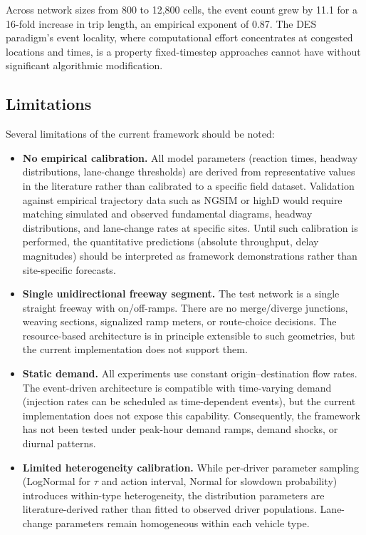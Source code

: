 \documentclass[review,number]{elsarticle}
\begin{document}
Across network sizes from 800 to 12{,}800 cells, the event count grew by 11.1 for a 16-fold increase in trip length, an empirical exponent of 0.87. The DES paradigm's event locality, where computational effort concentrates at congested locations and times, is a property fixed-timestep approaches cannot have without significant algorithmic modification.

\subsection{Limitations}

Several limitations of the current framework should be noted:

\begin{itemize}
    \item \textbf{No empirical calibration.} All model parameters (reaction times, headway distributions, lane-change thresholds) are derived from representative values in the literature rather than calibrated to a specific field dataset. Validation against empirical trajectory data such as NGSIM or highD would require matching simulated and observed fundamental diagrams, headway distributions, and lane-change rates at specific sites. Until such calibration is performed, the quantitative predictions (absolute throughput, delay magnitudes) should be interpreted as framework demonstrations rather than site-specific forecasts.

    \item \textbf{Single unidirectional freeway segment.} The test network is a single straight freeway with on/off-ramps. There are no merge/diverge junctions, weaving sections, signalized ramp meters, or route-choice decisions. The resource-based architecture is in principle extensible to such geometries, but the current implementation does not support them.

    \item \textbf{Static demand.} All experiments use constant origin--destination flow rates. The event-driven architecture is compatible with time-varying demand (injection rates can be scheduled as time-dependent events), but the current implementation does not expose this capability. Consequently, the framework has not been tested under peak-hour demand ramps, demand shocks, or diurnal patterns.

    \item \textbf{Limited heterogeneity calibration.} While per-driver parameter sampling (LogNormal for $\tau$ and action interval, Normal for slowdown probability) introduces within-type heterogeneity, the distribution parameters are literature-derived rather than fitted to observed driver populations. Lane-change parameters remain homogeneous within each vehicle type.


\end{itemize}
\end{document}
